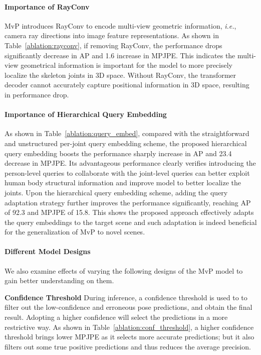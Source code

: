 \documentclass{article}
\newcommand{\ie}{\emph{i.e.}}
\begin{document}
\paragraph{Importance of RayConv} MvP introduces RayConv to encode multi-view geometric information, \ie, camera ray directions into image feature representations. 
As shown in Table~\ref{ablation:rayconv}, if removing RayConv, the performance drops significantly decrease in AP and 1.6 increase in MPJPE. This indicates  the multi-view geometrical information is important for the model to more precisely localize the skeleton joints in 3D space. {Without RayConv, the transformer decoder cannot accurately capture positional information in 3D space, resulting in performance drop.}


\paragraph{Importance of Hierarchical Query Embedding}
As shown in Table~\ref{ablation:query_embed}, compared with  the straightforward and unstructured per-joint query embedding scheme,  the proposed hierarchical query embedding boosts the performance sharply increase  in AP and 23.4 decrease in MPJPE. 
Its  advantageous performance clearly  verifies  introducing the person-level queries to collaborate with the joint-level queries can better exploit human body structural information   and improve model to better localize the joints. 
 Upon the hierarchical query embedding scheme, adding the query adaptation strategy further improves the performance significantly, reaching AP of 92.3 and MPJPE of 15.8. This shows the proposed approach effectively adapts the query embeddings to the target scene and such adaptation is indeed beneficial for the generalization of  MvP to novel scenes.


\paragraph{Different Model Designs } We also examine effects of varying the following    designs   of the MvP model to gain better understanding on them.


\textbf{Confidence Threshold } During inference, a confidence threshold is used to to filter out the low-confidence and erroneous pose predictions, and obtain the final result. Adopting a higher confidence will select the predictions in a more restrictive way. 
As shown in Table~\ref{ablation:conf_threshold}, a higher confidence threshold brings lower MPJPE as it selects more accurate predictions; but it also filters out some true positive predictions and thus reduces the average precision.
\end{document}
